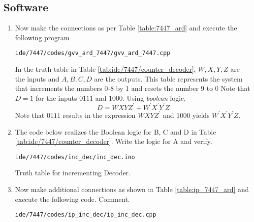 \subsection{Software}
\begin{enumerate}[label=\arabic*.,ref=\theenumi]
\item
Now make the connections as per Table \ref{table:7447_ard}  and execute the following program 
\begin{lstlisting}
ide/7447/codes/gvv_ard_7447/gvv_ard_7447.cpp
\end{lstlisting}

\begin{table}[H]
\centering

\caption{}
\label{table:7447_ard}
\end{table}
In the  truth table in Table \ref{tab:ide/7447/counter_decoder},  $W,X,Y,Z$ are the inputs
and $A,B,C,D$ are the outputs. This table represents the system that increments the numbers 0-8 by 1 and resets the number 9 to 0
%
Note that  $D = 1$ for the inputs $0111$ and $1000$.  Using {\em boolean} logic,
%
\begin{equation}
\label{bool_logic}
D = WXYZ^{\prime} + W^{\prime}X^{\prime}Y^{\prime}Z
\end{equation}
%
Note that $0111$ results in the expression $WXYZ^{\prime}$ and $1000$ yields $W^{\prime}X^{\prime}Y^{\prime}Z$. 
%
\item
The code below realizes the Boolean logic for B, C and D in  Table \ref{tab:ide/7447/counter_decoder}.  Write the logic for A and verify.
\begin{lstlisting}
ide/7447/codes/inc_dec/inc_dec.ino
\end{lstlisting}

\begin{table*}[!t]
\centering

\caption{Truth table for incrementing Decoder.}
\label{tab:ide/7447/counter_decoder}
\end{table*}
\item
Now make additional connections as shown in Table \ref{table:ip_7447_ard} and execute the following code.  Comment.
%			
\begin{lstlisting}
ide/7447/codes/ip_inc_dec/ip_inc_dec.cpp
\end{lstlisting}


\end{enumerate}
